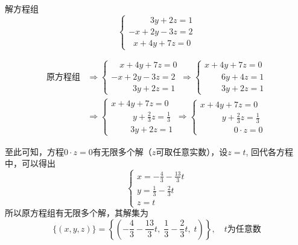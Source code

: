 \begin{example}
    解方程组
    \[\begin{cases}
     \qquad \;\; 3y+2z=1\\-x+2y-3z=2\\\;\; x+4y+7z=0 
    \end{cases}\]
\end{example}

\begin{solution}
    \[\begin{split}
    \text{原方程组}& \Rightarrow \begin{cases}
      \quad   x+4y+7z=0\\-x+2y-3z=2\\\qquad \;\;3y+2z=1
    \end{cases} \Rightarrow \begin{cases}
        x+4y+7z=0\\\qquad  6y+4z=1\\\qquad  3y+2z=1
    \end{cases}\\
    &\Rightarrow \begin{cases}
        x+4y+7z=0\\\qquad \;\; y+\frac{2}{3}z=\frac{1}{3}\\\qquad \;3y+2z=1 
    \end{cases}\Rightarrow \begin{cases}
        x+4y+7z=0\\\qquad \;\;y+\frac{2}{3}z=\frac{1}{3}\\\qquad \qquad  0\cdot z=0
    \end{cases}
    \end{split}\]
    
    至此可知，方程$0\cdot z=0$有无限多个解（$z$可取任意实数），设$z=t$, 回代各方程中，可以得出
    \[\begin{cases}
        x=-\frac{4}{3}-\frac{13}{3}t\\
        y=\frac{1}{3}-\frac{2}{3}t\\
        z=t
    \end{cases}\]
   所以原方程组有无限多个解，其解集为
    \[\{ (x,y, z) \} = \left\{ \left(-\frac{4}{3}-\frac{13}{3}t,\; \frac{1}{3}-\frac{2}{3}t,\; t\right) \right\}, \quad t\text{为任意数}\]
 \end{solution}
    
